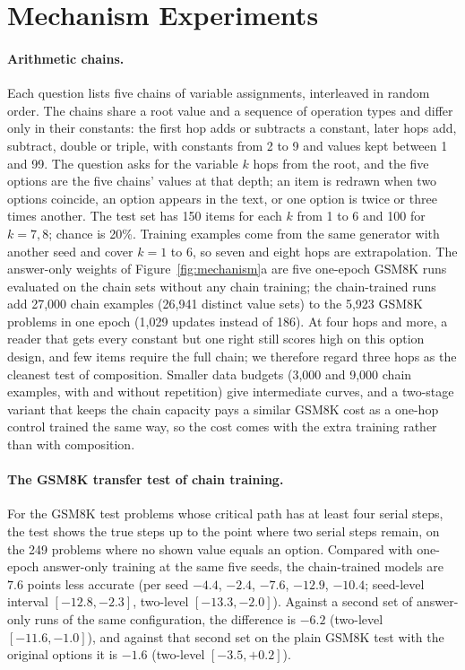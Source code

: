 \section{Mechanism Experiments}
\label{app:mechanism}

\paragraph{Arithmetic chains.} Each question lists five chains of variable assignments, interleaved in random order.
The chains share a root value and a sequence of operation types and differ only in their constants: the first hop
adds or subtracts a constant, later hops add, subtract, double or triple, with constants from 2 to 9 and values kept
between 1 and 99. The question asks for the variable $k$ hops from the root, and the five options are the five chains'
values at that depth; an item is redrawn when two options coincide, an option appears in the text, or one option is
twice or three times another. The test set has 150 items for each $k$ from 1 to 6 and 100 for $k = 7, 8$; chance is
20\%. Training examples come from the same generator with another seed and cover $k = 1$ to 6, so seven and eight hops
are extrapolation. The answer-only weights of Figure~\ref{fig:mechanism}a are five one-epoch GSM8K runs evaluated
on the chain sets without any chain training; the chain-trained runs add 27,000 chain examples (26,941 distinct value
sets) to the 5,923 GSM8K problems in one epoch (1,029 updates instead of 186). At four hops and more, a reader that
gets every constant but one right still scores high on this option design, and few items require the full chain; we
therefore regard three hops as the cleanest test of composition. Smaller data budgets (3,000 and 9,000 chain examples,
with and without repetition) give intermediate curves, and a two-stage variant that keeps the chain capacity pays a
similar GSM8K cost as a one-hop control trained the same way, so the cost comes with the extra training rather than
with composition.

\paragraph{The GSM8K transfer test of chain training.} For the GSM8K test problems whose critical path has at least
four serial steps, the test shows the true steps up to the point where two serial steps remain, on the 249 problems
where no shown value equals an option. Compared with one-epoch answer-only training at
the same five seeds, the chain-trained models are $7.6$ points less accurate (per seed $-4.4$, $-2.4$, $-7.6$, $-12.9$,
$-10.4$; seed-level interval $[-12.8, -2.3]$, two-level $[-13.3, -2.0]$). Against a second set of answer-only runs of
the same configuration, the difference is $-6.2$ (two-level $[-11.6, -1.0]$), and against that second set on the
plain GSM8K test with the original options it is $-1.6$ (two-level $[-3.5, +0.2]$).

